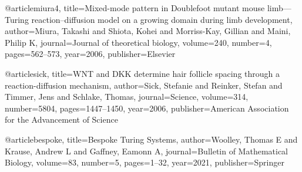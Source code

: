 @article{miura4,
  title={Mixed-mode pattern in Doublefoot mutant mouse limb—Turing reaction--diffusion model on a growing domain during limb development},
  author={Miura, Takashi and Shiota, Kohei and Morriss-Kay, Gillian and Maini, Philip K},
  journal={Journal of theoretical biology},
  volume={240},
  number={4},
  pages={562--573},
  year={2006},
  publisher={Elsevier}
}

@article{sick,
  title={WNT and DKK determine hair follicle spacing through a reaction-diffusion mechanism},
  author={Sick, Stefanie and Reinker, Stefan and Timmer, Jens and Schlake, Thomas},
  journal={Science},
  volume={314},
  number={5804},
  pages={1447--1450},
  year={2006},
  publisher={American Association for the Advancement of Science}
}

@article{bespoke,
  title={Bespoke Turing Systems},
  author={Woolley, Thomas E and Krause, Andrew L and Gaffney, Eamonn A},
  journal={Bulletin of Mathematical Biology},
  volume={83},
  number={5},
  pages={1--32},
  year={2021},
  publisher={Springer}
}
